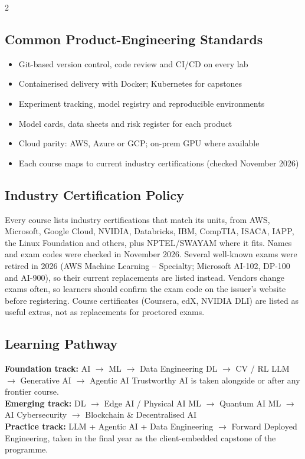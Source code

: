 \documentclass[10pt,a4paper]{article}
\begin{document}
\begin{multicols}{2}
\subsection*{Common Product-Engineering Standards}
\begin{itemize}\small
\item Git-based version control, code review and CI/CD on every lab
\item Containerised delivery with Docker; Kubernetes for capstones
\item Experiment tracking, model registry and reproducible environments
\item Model cards, data sheets and risk register for each product
\item Cloud parity: AWS, Azure or GCP; on-prem GPU where available
\item Each course maps to current industry certifications (checked November 2026)
\end{itemize}
\end{multicols}
\subsection*{Industry Certification Policy}
{\small Every course lists industry certifications that match its units, from AWS, Microsoft, Google Cloud, NVIDIA, Databricks, IBM, CompTIA, ISACA, IAPP, the Linux Foundation and others, plus NPTEL/SWAYAM where it fits. Names and exam codes were checked in November 2026. Several well-known exams were retired in 2026 (AWS Machine Learning -- Specialty; Microsoft AI-102, DP-100 and AI-900), so their current replacements are listed instead. Vendors change exams often, so learners should confirm the exam code on the issuer's website before registering. Course certificates (Coursera, edX, NVIDIA DLI) are listed as useful extras, not as replacements for proctored exams.}
\subsection*{Learning Pathway}
{\small{\color{gold}\bfseries Foundation track:} AI $\rightarrow$ ML $\rightarrow$ Data Engineering  DL $\rightarrow$ CV / RL  LLM $\rightarrow$ Generative AI $\rightarrow$ Agentic AI  Trustworthy AI is taken alongside or after any frontier course.\\
{\color{igreent}\bfseries Emerging track:} DL $\rightarrow$ Edge AI / Physical AI \quad ML $\rightarrow$ Quantum AI \quad ML $\rightarrow$ AI Cybersecurity $\rightarrow$ Blockchain \& Decentralised AI\\
{\color{gold}\bfseries Practice track:} LLM + Agentic AI + Data Engineering $\rightarrow$ Forward Deployed Engineering, taken in the final year as the client-embedded capstone of the programme.}
\newpage
\end{document}
